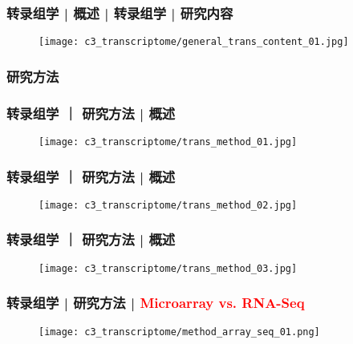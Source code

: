 \begin{frame}
  \frametitle{转录组学 | 概述 | 转录组学 | 研究内容}
  \begin{figure}
    \centering
    \texttt{[image: c3\_transcriptome/general\_trans\_content\_01.jpg]}
  \end{figure}
\end{frame}

\subsubsection{研究方法}
\begin{frame}
  \frametitle{转录组学 ｜ 研究方法 | 概述}
  \begin{figure}
    \centering
    \texttt{[image: c3\_transcriptome/trans\_method\_01.jpg]}
  \end{figure}
\end{frame}

\begin{frame}
  \frametitle{转录组学 ｜ 研究方法 | 概述}
  \begin{figure}
    \centering
    \texttt{[image: c3\_transcriptome/trans\_method\_02.jpg]}
  \end{figure}
\end{frame}

\begin{frame}
  \frametitle{转录组学 ｜ 研究方法 | 概述}
  \begin{figure}
    \centering
    \texttt{[image: c3\_transcriptome/trans\_method\_03.jpg]}
  \end{figure}
\end{frame}

\begin{frame}
  \frametitle{转录组学 | 研究方法 | \textcolor{red}{Microarray vs. RNA-Seq}}
  \begin{figure}
    \centering
    \texttt{[image: c3\_transcriptome/method\_array\_seq\_01.png]}
  \end{figure}
\end{frame}

